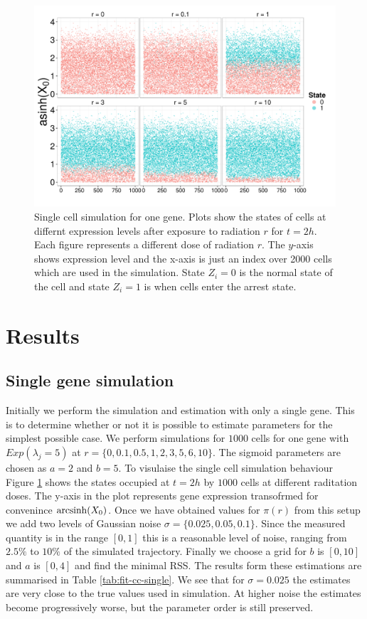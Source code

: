 \begin{figure}[!t]
  \centering
  \includegraphics[width=1\textwidth]{pics/cell-cycle-sim1.pdf}
  \caption{Single cell simulation for one gene. Plots show the states of cells at differnt expression levels after exposure to radiation $r$ for $t=2h$. Each figure represents a different dose of radiation $r$. The $y$-axis shows expression level and the x-axis is just an index over 2000 cells which are used in the simulation. State $Z_i = 0$ is the normal state of the cell and state $Z_i =1$ is when cells enter the arrest state. }
  \label{fig:rad-single-gene}
\end{figure}

\section{Results}
\label{sec:results-cc}

\subsection{Single gene simulation}
\label{sec:single-gene-simul}

Initially we perform the simulation and estimation with only a single gene. This is to determine whether or not it is possible to estimate parameters for the simplest possible case. We perform simulations for $1000$ cells for one gene with $Exp(\lambda_j = 5)$ at $r = \lbrace 0, 0.1, 0.5, 1, 2, 3, 5, 6, 10 \rbrace$. The sigmoid parameters are chosen as $a = 2$ and $b = 5$. To visulaise the single cell simulation behaviour Figure \ref{fig:rad-single-gene} shows the states occupied at $t = 2h$ by $1000$ cells at different raditation doses. The y-axis in the plot represents gene expression transofrmed for convenince $\operatorname{arcsinh}(X_0)$. Once we have obtained values for $\pi(r)$ from this setup we add two levels of Gaussian noise $\sigma = \lbrace 0.025, 0.05, 0.1 \rbrace$. Since the measured quantity is in the range $[0, 1]$ this is a reasonable level of noise, ranging from $2.5 \%$ to $10 \%$ of the simulated trajectory. Finally we choose a grid for $b$ is $[0, 10]$ and $a$ is $[0, 4]$ and find the minimal RSS. The results form these estimations are summarised in Table \ref{tab:fit-cc-single}. We see that for $\sigma = 0.025$ the estimates are very close to the true values used in simulation. At higher noise the estimates become progressively worse, but the parameter order is still preserved. 

